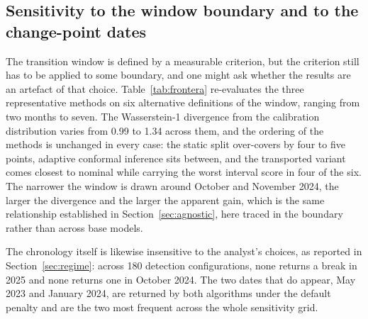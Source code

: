 \documentclass[preprint,3p,times]{elsarticle}
\providecommand{\DIFaddtex}[1]{{\protect\color{blue} \sf #1}} %
\providecommand{\DIFaddbegin}{} %
\providecommand{\DIFaddend}{} %
\providecommand{\DIFdelbegin}{} %
\providecommand{\DIFdelend}{} %
\providecommand{\DIFadd}[1]{\texorpdfstring{\DIFaddtex{#1}}{#1}} %
\begin{document}
\DIFdelbegin %
\DIFdelend \DIFaddbegin \subsection{Sensitivity to the window boundary and to the change-point dates}
\label{sec:frontera}
\DIFaddend 

\DIFaddbegin \DIFadd{The transition window is defined by a measurable criterion, but the criterion still has to be applied to some boundary, and one might ask whether the results are an artefact of that choice. Table~\ref{tab:frontera} re-evaluates the three representative methods on six alternative definitions of the window, ranging from two months to seven. The Wasserstein-1 divergence from the calibration distribution varies from 0.99 to 1.34 across them, and the ordering of the methods is unchanged in every case: the static split over-covers by four to five points, adaptive conformal inference sits between, and the transported variant comes closest to nominal while carrying the worst interval score in four of the six. The narrower the window is drawn around October and November 2024, the larger the divergence and the larger the apparent gain, which is the same relationship established in Section~\ref{sec:agnostic}, here traced in the boundary rather than across base models.
}



\DIFadd{The chronology itself is likewise insensitive to the analyst's choices, as reported in Section~\ref{sec:regime}: across 180 detection configurations, none returns a break in 2025 and none returns one in October 2024. The two dates that do appear, May 2023 and January 2024, are returned by both algorithms under the default penalty and are the two most frequent across the whole sensitivity grid.
}
\end{document}
